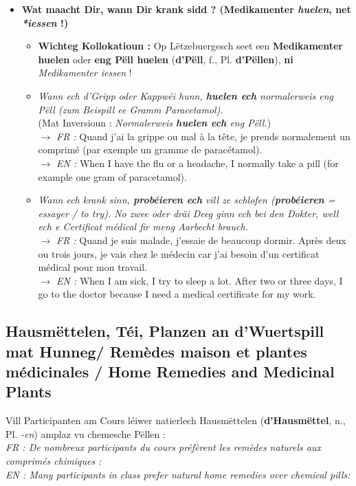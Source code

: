 \begin{itemize}
    \item \textbf{Wat maacht Dir, wann Dir krank sidd ? (Medikamenter \textit{huelen}, net \textit{*iessen} !)}
    \begin{itemize}
        \item \textbf{Wichteg Kollokatioun :} Op Lëtzebuergesch seet een \textbf{Medikamenter huelen} oder \textbf{eng Pëll huelen} (\textbf{d'Pëll}, f., Pl. \textbf{d'Pëllen}), \textbf{ni} \textit{\flqq *Medikamenter iessen\frqq} !
        \item \textit{Wann ech d'Gripp oder Kappwéi hunn, \textbf{huelen ech} normalerweis eng Pëll (zum Beispill ee Gramm Paracetamol).} \\
        (Mat Inversioun : \textit{Normalerweis \textbf{huelen ech} eng Pëll.}) \\
        $\rightarrow$ \textit{FR :} Quand j'ai la grippe ou mal à la tête, je prends normalement un comprimé (par exemple un gramme de paracétamol). \\
        $\rightarrow$ \textit{EN :} When I have the flu or a headache, I normally take a pill (for example one gram of paracetamol).
        \item \textit{Wann ech krank sinn, \textbf{probéieren ech} vill ze schlofen (\textbf{probéieren} = essayer / to try). No zwee oder dräi Deeg ginn ech bei den Dokter, well ech e Certificat médical fir meng Aarbecht brauch.} \\
        $\rightarrow$ \textit{FR :} Quand je suis malade, j'essaie de beaucoup dormir. Après deux ou trois jours, je vais chez le médecin car j'ai besoin d'un certificat médical pour mon travail. \\
        $\rightarrow$ \textit{EN :} When I am sick, I try to sleep a lot. After two or three days, I go to the doctor because I need a medical certificate for my work.
    \end{itemize}
\end{itemize}

\subsection{Hausmëttelen, Téi, Planzen an d'Wuertspill mat \flqq Hunneg\frqq / Remèdes maison et plantes médicinales / Home Remedies and Medicinal Plants}

Vill Participanten am Cours léiwer natierlech Hausmëttelen (\textbf{d'Hausmëttel}, n., Pl. \textit{-en}) amplaz vu chemesche Pëllen : \\
\textit{FR : De nombreux participants du cours préfèrent les remèdes naturels aux comprimés chimiques :} \\
\textit{EN : Many participants in class prefer natural home remedies over chemical pills:}

